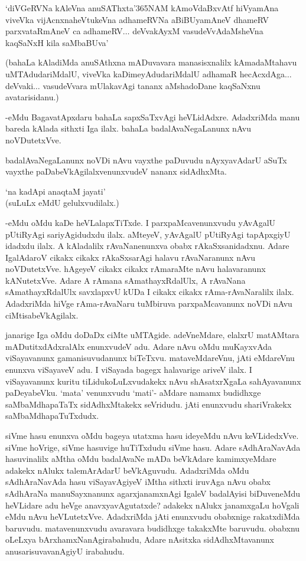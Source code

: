 \begin{shloka}
`diVGeRVNa kAleVna anuSAThxta\char'365NAM kAmoVdaBxvAtf hiVyamAna\\
viveVka vijAcnxnaheVtukeVna adhameRVNa aBiBUyamAneV dhameRV\\
parxvataRmAneV ca adhameRV$\ldots$ deVvakAyxM vasudeVvAdaMsheVna kaqSaNxH kila saMbaBUva'
\end{shloka}

(bahaLa kAladiMda anuSAthxna mADuvavara manasisxnalilx kAmadaMtahavu uMTAdudariMdalU, viveVka kaDimeyAdudariMdalU adhamaR hecAcxdAga$\ldots$ deVvaki$\ldots$ vasudeVvara mUlakavAgi tananx aMshadoDane kaqSaNxnu avatarisidanu.)

-eMdu BagavatApxdaru bahaLa sapxSaTxvAgi heVLidAdxre. AdadxriMda manu bareda kAlada sithxti Iga ilalx. bahaLa badalAvaNegaLanunx nAvu noVDutetxVve.

badalAvaNegaLanunx noVDi nAvu vayxthe paDuvudu nAyxyavAdarU aSuTx vayxthe paDabeVkAgilalxvenunxvudeV nananx sidAdhxMta.

\begin{shloka}
`na kadApi anaqtaM jayati'\\
(suLuLx eMdU gelulxvudilalx.)
\end{shloka}

-eMdu oMdu kaDe heVLalapxTiTxde. I parxpaMcavenunxvudu yAvAgalU pUtiRyAgi sariyAgidudxdu ilalx. aMteyeV, yAvAgalU pUtiRyAgi tapApxgiyU idadxdu ilalx. A kAladalilx rAvaNanenunxva obabx rAkaSxsanidadxnu. Adare IgalAdaroV cikakx cikakx rAkaSxsarAgi halavu rAvaNaranunx nAvu noVDutetxVve. hAgeyeV cikakx cikakx rAmaraMte nAvu halavaranunx kANutetxVve. Adare A rAmana sAmathayxRdalUlx, A rAvaNana sAmathayxRdalUlx savxlapxvU kUDa I cikakx cikakx rAma-rAvaNaralilx ilalx. AdadxriMda hiVge rAma-rAvaNaru tuMbiruva parxpaMcavanunx noVDi nAvu ciMtisabeVkAgilalx.

janarige Iga oMdu doDaDx ciMte uMTAgide. adeVneMdare, elalxrU matAMtara mADutitxdAdxralAlx enunxvudeV adu. Adare nAvu oMdu muKayxvAda viSayavanunx gamanisuvudanunx biTeTxvu. mataveMdareVnu, jAti eMdareVnu enunxva viSayaveV adu. I viSayada bagegx halavarige ariveV ilalx. I viSayavanunx kuritu tiLidukoLuLxvudakekx nAvu shAsatxrXgaLa sahAyavanunx paDeyabeVku. `mata' venunxvudu `mati'- aMdare namamx budidhxge saMbaMdhapaTaTx sidAdhxMtakekx seVridudu. jAti enunxvudu shariVrakekx saMbaMdhapaTuTxdudx.

siVme hasu enunxva oMdu bageya utatxma hasu ideyeMdu nAvu keVLidedxVve. siVme hoVrige, siVme hasuvige huTiTxdudu siVme hasu. Adare sAdhAraNavAda hasuvinalilx aMtha oMdu badalAvaNe mADa beVkAdare kamimxyeMdare adakekx nAlukx talemArAdarU beVkAguvudu. AdadxriMda oMdu sAdhAraNavAda hasu viSayavAgiyeV iMtha sithxti iruvAga nAvu obabx sAdhAraNa manuSayxnanunx agarxjanamxnAgi IgaleV badalAyisi biDuveneMdu heVLidare adu heVge anavxyavAgutatxde? adakekx nAlukx janamxgaLu hoVgali eMdu nAvu heVLutetxVve. AdadxriMda jAti enunxvudu obabxnige rakatxdiMda baruvudu. matavenunxvudu avaravara budidhxge takakxMte baruvudu. obabxnu oLeLxya bArxhamxNanAgirabahudu, Adare nAsitxka sidAdhxMtavanunx anusarisuvavanAgiyU irabahudu.

